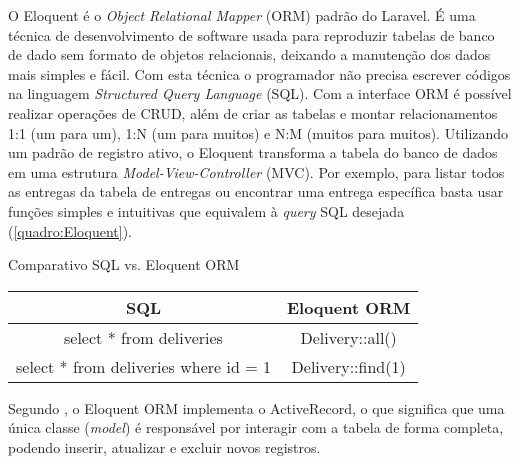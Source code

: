 O Eloquent é o \textit{Object Relational Mapper} (ORM) padrão do Laravel. É uma técnica de desenvolvimento de software usada para reproduzir tabelas de banco de dado sem formato de objetos relacionais, deixando a manutenção dos dados mais simples e fácil. Com esta técnica o programador não precisa escrever códigos na linguagem \textit{Structured Query Language} (SQL). Com a interface ORM é possível realizar operações de CRUD, além de criar as tabelas e montar relacionamentos 1:1 (um para um), 1:N (um para muitos) e N:M (muitos para muitos). Utilizando um padrão de registro ativo, o Eloquent transforma a tabela do banco de dados em uma estrutura \textit{Model-View-Controller} (MVC). Por exemplo, para listar todos as entregas da tabela de entregas ou encontrar uma entrega específica basta usar funções simples e intuitivas que equivalem à \textit{query} SQL desejada (\autoref{quadro:Eloquent}).

\begin{quadro}[H]
    \centering
    \caption{Comparativo SQL vs. Eloquent ORM
    \label{quadro:Eloquent}}
\begin{tabular}{|c|c|}
\hline
\textbf{SQL} & \textbf{Eloquent ORM} \\ \hline
select * from deliveries & Delivery::all() \\ \hline
select * from deliveries where id = 1 & Delivery::find(1) \\ \hline
\end{tabular}
\end{quadro}

Segundo , o Eloquent ORM implementa o ActiveRecord, o que significa que uma única classe (\textit{model}) é responsável por interagir com a tabela de forma completa, podendo inserir, atualizar e excluir novos registros.